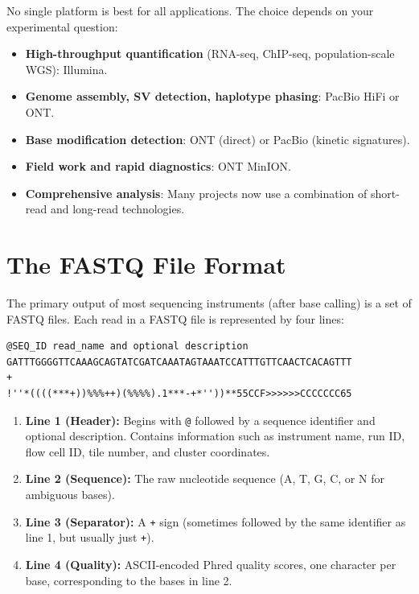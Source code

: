 \begin{tipbox}[title={Choosing a Platform}]
No single platform is best for all applications. The choice depends on your experimental question:
\begin{itemize}[nosep]
  \item \textbf{High-throughput quantification} (RNA-seq, ChIP-seq, population-scale WGS): Illumina.
  \item \textbf{Genome assembly, SV detection, haplotype phasing}: PacBio HiFi or ONT.
  \item \textbf{Base modification detection}: ONT (direct) or PacBio (kinetic signatures).
  \item \textbf{Field work and rapid diagnostics}: ONT MinION.
  \item \textbf{Comprehensive analysis}: Many projects now use a combination of short-read and long-read technologies.
\end{itemize}
\end{tipbox}


\section{The FASTQ File Format}
\label{sec:seqprinciples:fastq}

The primary output of most sequencing instruments (after base calling) is a set of \acrshort{FASTQ} files. Each read in a FASTQ file is represented by four lines:

\begin{lstlisting}[language={},caption={Anatomy of a FASTQ record.},label={lst:seqprinciples:fastq}]
@SEQ_ID read_name and optional description
GATTTGGGGTTCAAAGCAGTATCGATCAAATAGTAAATCCATTTGTTCAACTCACAGTTT
+
!''*((((***+))%%%++)(%%%%).1***-+*''))**55CCF>>>>>>CCCCCCC65
\end{lstlisting}

\begin{enumerate}[itemsep=2pt]
  \item \textbf{Line 1 (Header):} Begins with \texttt{@} followed by a sequence identifier and optional description. Contains information such as instrument name, run ID, flow cell ID, tile number, and cluster coordinates.
  \item \textbf{Line 2 (Sequence):} The raw nucleotide sequence (A, T, G, C, or N for ambiguous bases).
  \item \textbf{Line 3 (Separator):} A \texttt{+} sign (sometimes followed by the same identifier as line 1, but usually just \texttt{+}).
  \item \textbf{Line 4 (Quality):} ASCII-encoded Phred quality scores, one character per base, corresponding to the bases in line 2.
\end{enumerate}

